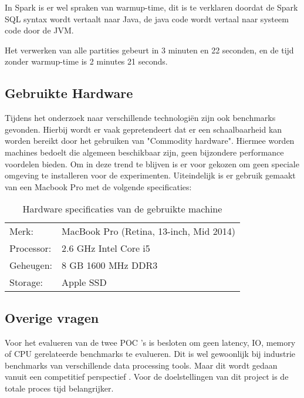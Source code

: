 In Spark is er wel spraken van warmup-time, dit is te verklaren doordat de Spark SQL syntax wordt vertaalt naar Java, de java code wordt vertaal naar systeem code door de JVM.

Het verwerken van alle partities gebeurt in 3 minuten en 22 seconden, en de tijd zonder warmup-time is 2 minutes 21 seconds.



\subsection{Gebruikte Hardware}
\label{subsec:hardware_specs}

Tijdens het onderzoek naar verschillende technologiën zijn ook benchmarks gevonden. Hierbij wordt er vaak gepretendeert dat er een schaalbaarheid kan worden bereikt door het gebruiken van "Commodity hardware". Hiermee worden machines bedoelt die algemeen beschikbaar zijn, geen bijzondere performance voordelen bieden. Om in deze trend te blijven is er voor gekozen om geen speciale omgeving te installeren voor de experimenten. Uiteindelijk is er gebruik gemaakt van een Macbook Pro met de volgende specificaties:

\begin{table}[h]
\caption{Hardware specificaties van de gebruikte machine}
\label{tab:hardware_specs}
\begin{tabular}{ll}
Merk:      & MacBook Pro (Retina, 13-inch, Mid 2014) \\
Processor: & 2.6 GHz Intel Core i5                   \\
Geheugen:  & 8 GB 1600 MHz DDR3                      \\
Storage:   & Apple SSD                                  
\end{tabular}
\end{table}

\subsection{Overige vragen}

Voor het evalueren van de twee POC 's is besloten om geen latency, IO, memory of CPU gerelateerde benchmarks te evalueren. Dit is wel gewoonlijk bij industrie benchmarks van verschillende data processing tools. Maar dit wordt gedaan vanuit een competitief perspectief  \parencite{ousterhout2015making}. Voor de doelstellingen van dit project is de totale proces tijd belangrijker.
